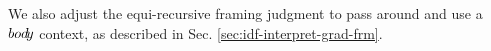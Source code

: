 \documentclass {llncs}
\begin{document}
We also adjust the equi-recursive framing judgment to pass around and use a $bod{\!y}$ context, as described in Sec. \ref{sec:idf-interpret-grad-frm}.
%
%
%
%
%
\end{document}
